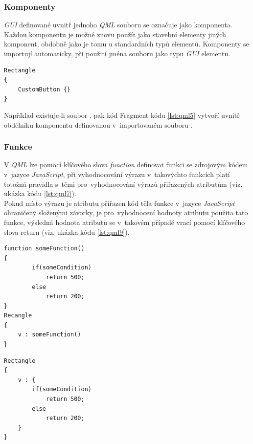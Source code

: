 \documentclass[11pt,twoside,a4paper]{book}
\begin{document}
\subsubsection{Komponenty}
\textit{GUI} definované uvnitř jednoho \textit{QML} souboru se označuje jako komponenta. Každou komponentu je možné znovu použít jako stavební elementy jiných komponent, obdobně jako je tomu u standardních typů elementů. Komponenty se importují automaticky, při použití jména souboru jako typu \textit{GUI} elementu.

\begin{lstlisting}[frame=single,caption=Ukázka použití komponenty z jiného souboru.,label=lst:qml5]
Rectangle
{
	CustomButton {}
}
\end{lstlisting}
Například existuje-li soubor , pak kód Fragment kódu \ref{lst:qml5} vytvoří uvnitř obdélníku komponentu definovanou v~importovaném souboru .

\subsubsection{Funkce}

V \textit{QML} lze pomocí klíčového slova \textit{function} definovat funkci se zdrojovým kódem v~jazyce \textit{JavaScript}, při vyhodnocování výrazu v~takovýchto funkcích platí totožná pravidla s~těmi pro~vyhodnocování výrazů přiřazených atributům (viz. ukázka kódu \ref{lst:qml7}).\\
Pokud místo výrazu je atributu přiřazen kód těla funkce v~jazyce \textit{JavaScript} ohraničený složenými závorky, je pro~vyhodnocení hodnoty atributu použita tato funkce, výsledná hodnota atributu se v~takovém případě vrací pomocí klíčového slova return (viz. ukázka kódu \ref{lst:qml9}).
\begin{lstlisting}[frame=single,caption=Ukázka použití funkce definované pomocí klíčového slova \textit{function} pro určení hodnoty atributu.,label=lst:qml7]
function someFunction()
{
		if(someCondition)
			return 500;
		else
			return 200;
}
Recangle
{
	v : someFunction()
}
\end{lstlisting}

\begin{lstlisting}[frame=single,caption=Ukázka použití funkce definované v rámci elementu pro určení hodnoty atributu.,label=lst:qml9]
Rectangle
{
	v : {
		if(someCondition)
			return 500;
		else
			return 200;
	}
}
\end{lstlisting}
\end{document}

